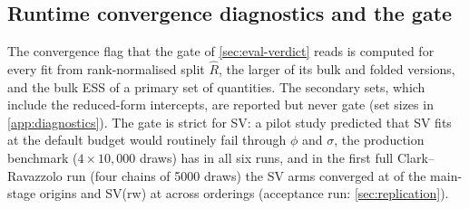 \subsection{Runtime convergence diagnostics and the gate}\label{sec:validation-convergence}

The convergence flag that the gate of \cref{sec:eval-verdict} reads is computed for every fit from
rank-normalised split $\hat R$, the larger of its bulk and folded versions, and the bulk ESS
\citep{geyer1992practical,vehtari2021rank} of a primary set of quantities. %
The secondary sets, which include the reduced-form intercepts, are reported but never gate (set
sizes in \cref{app:diagnostics}). %
The gate is strict for SV: a pilot study predicted that SV fits at the default budget would
routinely fail through $\phi$ and $\sigma$, %
the production benchmark ($4 \times 10{,}000$ draws) has  in all six runs, %
and in the first full Clark--Ravazzolo run (four chains of 5000 draws) the SV arms converged at
 of the main-stage origins and SV(rw) at  across orderings
(acceptance run: \cref{sec:replication}). %
